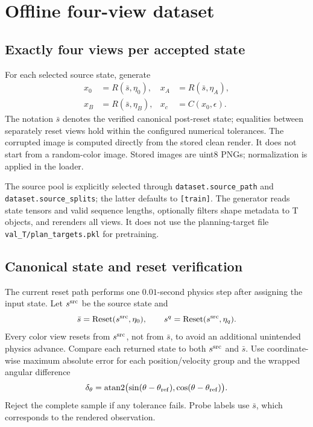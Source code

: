\documentclass[11pt,a4paper]{article}
\newcommand{\code}[1]{\nolinkurl{#1}}
\begin{document}
\section{Offline four-view dataset}
\subsection{Exactly four views per accepted state}
For each selected source state, generate
\begin{align}
x_0&=R(\bar{s},\eta_0), & x_A&=R(\bar{s},\eta_A),\\
x_B&=R(\bar{s},\eta_B), & x_c&=C(x_0,\epsilon).
\end{align}
The notation $\bar{s}$ denotes the verified canonical post-reset state; equalities
between separately reset views hold within the configured numerical tolerances.
The corrupted image is computed directly from the stored clean render. It does
not start from a random-color image. Stored images are uint8 PNGs; normalization
is applied in the loader.

The source pool is explicitly selected through \code{dataset.source_path} and
\code{dataset.source_splits}; the latter defaults to \code{[train]}. The generator
reads state tensors and valid sequence lengths, optionally filters shape metadata
to T objects, and rerenders all views. It does not use the planning-target file
\code{val_T/plan_targets.pkl} for pretraining.

\subsection{Canonical state and reset verification}
The current reset path performs one $0.01$-second physics step after assigning
the input state. Let $s^{\rm src}$ be the source state and
\begin{equation}
\bar{s}=\operatorname{Reset}(s^{\rm src},\eta_0),\qquad
s^{q}=\operatorname{Reset}(s^{\rm src},\eta_q).
\end{equation}
Every color view resets from $s^{\rm src}$, not from $\bar{s}$, to avoid an additional
unintended physics advance. Compare each returned state to both $s^{\rm src}$ and
$\bar{s}$. Use coordinate-wise maximum absolute error for each position/velocity
group and the wrapped angular difference
\begin{equation}
\delta_\theta=\operatorname{atan2}\bigl(\sin(\theta-\theta_{\rm ref}),
\cos(\theta-\theta_{\rm ref})\bigr).
\end{equation}
Reject the complete sample if any tolerance fails. Probe labels use $\bar{s}$,
which corresponds to the rendered observation.
\end{document}
